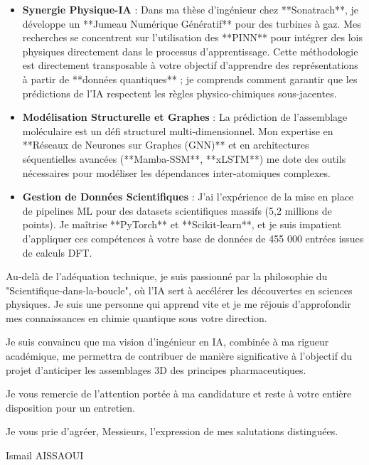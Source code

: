\documentclass[11pt,a4paper]{article}
\begin{document}
\begin{itemize}
    \item \textbf{Synergie Physique-IA} : Dans ma thèse d'ingénieur chez **Sonatrach**, je développe un **Jumeau Numérique Génératif** pour des turbines à gaz. Mes recherches se concentrent sur l'utilisation des **PINN** pour intégrer des lois physiques directement dans le processus d'apprentissage. Cette méthodologie est directement transposable à votre objectif d'apprendre des représentations à partir de **données quantiques** ; je comprends comment garantir que les prédictions de l'IA respectent les règles physico-chimiques sous-jacentes.
    \item \textbf{Modélisation Structurelle et Graphes} : La prédiction de l'assemblage moléculaire est un défi structurel multi-dimensionnel. Mon expertise en **Réseaux de Neurones sur Graphes (GNN)** et en architectures séquentielles avancées (**Mamba-SSM**, **xLSTM**) me dote des outils nécessaires pour modéliser les dépendances inter-atomiques complexes.
    \item \textbf{Gestion de Données Scientifiques} : J'ai l'expérience de la mise en place de pipelines ML pour des datasets scientifiques massifs (5,2 millions de points). Je maîtrise **PyTorch** et **Scikit-learn**, et je suis impatient d'appliquer ces compétences à votre base de données de 455 000 entrées issues de calculs DFT.
\end{itemize}

Au-delà de l'adéquation technique, je suis passionné par la philosophie du "Scientifique-dans-la-boucle", où l'IA sert à accélérer les découvertes en sciences physiques. Je suis une personne qui apprend vite et je me réjouis d'approfondir mes connaissances en chimie quantique sous votre direction.

Je suis convaincu que ma vision d'ingénieur en IA, combinée à ma rigueur académique, me permettra de contribuer de manière significative à l'objectif du projet d'anticiper les assemblages 3D des principes pharmaceutiques.

Je vous remercie de l'attention portée à ma candidature et reste à votre entière disposition pour un entretien.

\bigskip

\noindent Je vous prie d'agréer, Messieurs, l'expression de mes salutations distinguées.

\bigskip

\noindent Ismail AISSAOUI
\end{document}
